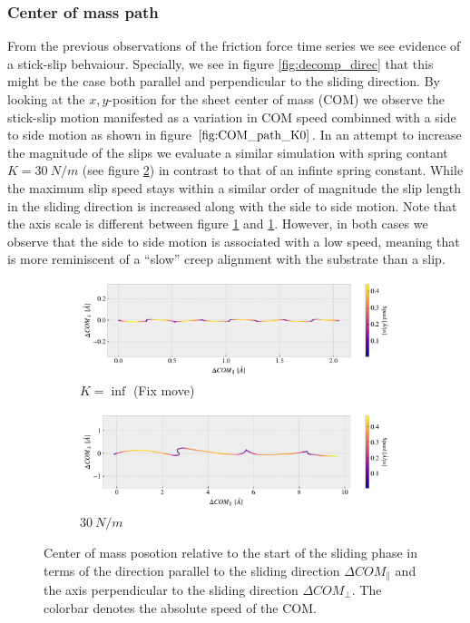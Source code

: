 \subsubsection{Center of mass path}
From the previous observations of the friction force time series we see evidence
of a stick-slip behvaiour. Specially, we see in figure \ref{fig:decomp_direc}
that this might be the case both parallel and perpendicular to the sliding
direction. By looking at the $x,y$-position for the sheet center of mass (COM)
we observe the stick-slip motion manifested as a variation in COM speed combinned
with a side to side motion as shown in figure $\ref{fig:COM_path_K0}$. In an attempt to increase the magnitude of the slips we evaluate a similar simulation with spring contant $K = \SI{30}{N/m}$ (see figure
\ref{fig:COM_path_K30}) in contrast to that of an infinte spring constant. While
the maximum slip speed stays within a similar order of magnitude the slip length
in the sliding direction is increased along with the side to side motion. Note
that the axis scale is different between figure \ref{fig:COM_path_K0} and
\ref{fig:COM_path_K0}. However, in both cases we observe that the side to side
motion is associated with a low speed, meaning that is more reminiscent of a ``slow'' creep alignment with the substrate than a slip. 


\begin{figure}[H]
  \centering
  \begin{subfigure}[t]{0.85\textwidth}
    \centering
    \includegraphics[width=\textwidth]{figures/baseline/COM_path_K0.pdf}
    \caption{$K=\inf$ (Fix move)}
    \label{fig:COM_path_K0}
  \end{subfigure}
  \hfill
  \begin{subfigure}[t]{0.85\textwidth}
      \centering
      \includegraphics[width=\textwidth]{figures/baseline/COM_path_K30.pdf}
      \caption{$\SI{30}{N/m}$}
      \label{fig:COM_path_K30}
  \end{subfigure}
  \caption{Center of mass posotion relative to the start of the sliding phase in terms of the direction parallel to the sliding direction $\Delta COM_{\parallel}$ and the axis perpendicular to the sliding direction $\Delta COM_{\perp}$. The colorbar denotes the absolute speed of the COM.}
  \label{fig:COM_path}
\end{figure}


